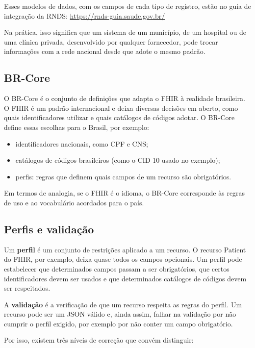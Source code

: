 \documentclass[11pt,a4paper]{article}
\begin{document}
Esses modelos de dados, com os campos de cada tipo de registro, estão no
guia de integração da RNDS: \url{https://rnds-guia.saude.gov.br/}

Na prática, isso significa que um sistema de um município, de um hospital
ou de uma clínica privada, desenvolvido por qualquer fornecedor, pode
trocar informações com a rede nacional desde que adote o mesmo padrão.

\subsection{BR-Core}

O BR-Core é o conjunto de definições que adapta o FHIR à realidade
brasileira. O FHIR é um padrão internacional e deixa diversas decisões em
aberto, como quais identificadores utilizar e quais catálogos de códigos
adotar. O BR-Core define essas escolhas para o Brasil, por exemplo:

\begin{itemize}
  \item identificadores nacionais, como CPF e CNS;
  \item catálogos de códigos brasileiros (como o CID-10 usado no exemplo);
  \item perfis: regras que definem quais campos de um recurso são
    obrigatórios.
\end{itemize}

Em termos de analogia, se o FHIR é o idioma, o BR-Core corresponde às
regras de uso e ao vocabulário acordados para o país.

\subsection{Perfis e validação}

Um \textbf{perfil} é um conjunto de restrições aplicado a um recurso. O
recurso Patient do FHIR, por exemplo, deixa quase todos os campos
opcionais. Um perfil pode estabelecer que determinados campos passam a ser
obrigatórios, que certos identificadores devem ser usados e que
determinados catálogos de códigos devem ser respeitados.

A \textbf{validação} é a verificação de que um recurso respeita as regras
do perfil. Um recurso pode ser um JSON válido e, ainda assim, falhar na
validação por não cumprir o perfil exigido, por exemplo por não conter um
campo obrigatório.

Por isso, existem três níveis de correção que convém distinguir:
\end{document}
